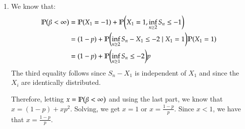 \documentclass[12pt]{article}
\theoremstyle{definitionstyle}
\newcommand{\SET}[1]{\Set{\mskip-\medmuskip #1 \mskip-\medmuskip}}
\newcommand{\1}{\mathds 1}
\renewcommand{\P}{\mathbb P \qty}
\begin{document}
\begin{enumerate}
\begin{enumerate}[label=(\alph*)]
            Now, suppose that $\P(\beta < \infty) = 1$. Then $\P(\inf S_n \leq -k) = 1$ for every $k \geq 1$. Notice that:
            \begin{align*}
                \SET{\inf S_n \leq k} \searrow \SET{\inf S_n = -\infty}
            \end{align*}
            And so, $\P(\inf S_n = -\infty) = 1$. Yet, recall that
            \begin{align*}
                \P(\liminf S_n \geq 0) \geq \P(\liminf S_n/n = 2p-1) = 1.
            \end{align*} Then for $\omega$ almost surely, $S_n \geq 0$ eventually, and so the infimum is finite. Then $\P(\inf S_n = -\infty) = 0$, a contradiction.

            \item We know that:
        \begin{align*}
            \P(\beta < \infty) &= \P(X_1 = -1) + \P(X_1 = 1, \inf_{n \geq 2} S_n \leq -1) \\
            &= (1-p) + \P(\inf_{n \geq 2} S_n - X_1 \leq -2 \mid X_1 = 1) \P(X_1 = 1) \\
            &= (1-p) + \P(\inf_{n \geq 1} S_n \leq -2) p
        \end{align*}
        The third equality follows since $S_n - X_1$ is independent of $X_1$ and since the $X_i$ are identically distributed. 

        Therefore, letting $x = \P(\beta < \infty)$ and using the last part, we know that $x = (1-p) + xp^2$. Solving, we get $x = 1$ or $x = \frac{1-p}{p}$. Since $x < 1$, we have that $x = \frac{1-p}{p}$. 


\end{enumerate}
\end{enumerate}
\end{document}
